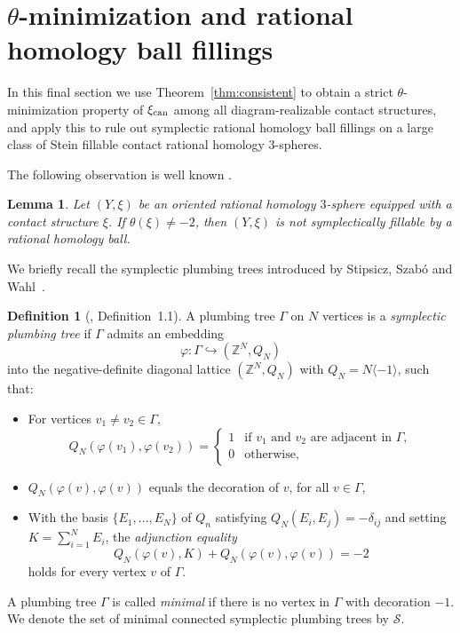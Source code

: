 \documentclass[11pt]{amsart}
\theoremstyle{plain}
\newtheorem{lemma}[theorem]{Lemma}
\theoremstyle{definition}
\newtheorem{definition}[theorem]{Definition}
\theoremstyle{remark}
\newcommand{\Z}{\mathbb{Z}}
\begin{document}
\section{$\theta$-minimization and rational homology ball fillings}\label{sec:rhb}

In this final section we use Theorem~\ref{thm:consistent} to obtain a
strict $\theta$-minimization property of $\xi_{\rm can}$ among
all diagram-realizable contact structures, and apply this to rule out
symplectic rational homology ball fillings on a large class of Stein
fillable contact rational homology $3$-spheres.

The following observation is well known
\cite[Lemma~2.14]{EtnyreOzbagciTosun2025}.

\begin{lemma}\label{lem:rhb}
Let $(Y,\xi)$ be an oriented rational homology $3$-sphere equipped
with a contact structure $\xi$. If $\theta(\xi)\neq -2$, then
$(Y,\xi)$ is not symplectically fillable by a rational homology ball.
\end{lemma}

We briefly recall the symplectic plumbing trees introduced by
Stipsicz, Szab\'{o} and Wahl~\cite{StipsiczSzaboWahl08}.

\begin{definition}[\cite{StipsiczSzaboWahl08}, Definition~1.1]
A plumbing tree $\Gamma$ on $N$ vertices is a \emph{symplectic
plumbing tree} if $\Gamma$ admits an embedding
\[
\varphi\colon\Gamma\hookrightarrow(\Z^N,Q_N)
\]
into the negative-definite diagonal lattice $(\Z^N,Q_N)$ with
$Q_N=N\langle -1\rangle$, such that:
\begin{itemize}
\item For vertices $v_1\ne v_2\in\Gamma$,
    \[
    Q_N(\varphi(v_1),\varphi(v_2))=
    \begin{cases}
    1 & \text{if }v_1\text{ and }v_2\text{ are adjacent in }\Gamma,\\
    0 & \text{otherwise,}
    \end{cases}
    \]
\item $Q_N(\varphi(v),\varphi(v))$ equals the decoration of $v$, for
      all $v\in\Gamma$,
\item With the basis $\{E_1,\dots,E_N\}$ of $Q_n$ satisfying
      $Q_N(E_i,E_j)=-\delta_{ij}$ and setting $K=\sum_{i=1}^N E_i$,
      the \emph{adjunction equality}
      \[
      Q_N(\varphi(v),K)+Q_N(\varphi(v),\varphi(v))=-2 
      \]
      holds for every vertex $v$ of $\Gamma$.
\end{itemize}
A plumbing tree $\Gamma$ is called \emph{minimal} if there is no
vertex in $\Gamma$ with decoration $-1$. We denote the set of minimal
connected symplectic plumbing trees by $\mathcal{S}$.
\end{definition}
\end{document}
